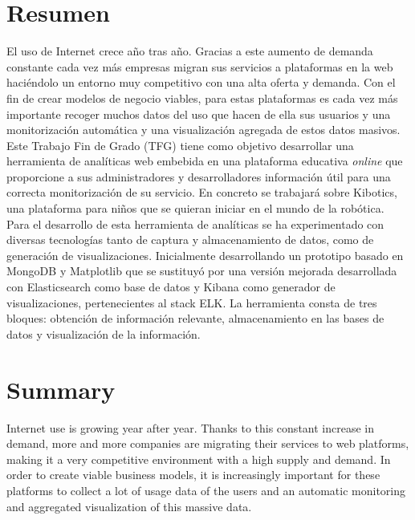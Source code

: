 \documentclass[a4paper, 12pt]{book}
\begin{document}
		
	\chapter*{Resumen}

		El uso de Internet crece año tras año. Gracias a este aumento de demanda constante cada vez más empresas migran sus servicios a plataformas en la web haciéndolo un entorno muy competitivo con una alta oferta y demanda. Con el fin de crear modelos de negocio viables, para estas plataformas es cada vez más importante recoger muchos datos del uso que hacen de ella sus usuarios y una monitorización automática y una visualización agregada de estos datos masivos. \\
		
		Este Trabajo Fin de Grado (TFG) tiene como objetivo desarrollar una herramienta de analíticas web embebida en una plataforma educativa \textit{online} que proporcione a sus administradores y desarrolladores información útil para una correcta monitorización de su servicio. En concreto se trabajará sobre Kibotics, una plataforma para niños que se quieran iniciar en el mundo de la robótica. \\
		
		Para el desarrollo de esta herramienta de analíticas se ha experimentado con diversas tecnologías tanto de captura y almacenamiento de datos, como de generación de visualizaciones. Inicialmente desarrollando un prototipo basado en MongoDB y Matplotlib que se sustituyó por una versión mejorada desarrollada con Elasticsearch como base de datos y Kibana como generador de visualizaciones, pertenecientes al stack ELK. La herramienta consta de tres bloques: obtención de información relevante, almacenamiento en las bases de datos y visualización de la información. \\
		
		
	\chapter*{Summary}
		Internet use is growing year after year. Thanks to this constant increase in demand, more and more companies are migrating their services to web platforms, making it a very competitive environment with a high supply and demand. In order to create viable business models, it is increasingly important for these platforms to collect a lot of usage data of the users and an automatic monitoring and aggregated visualization of this massive data. \\
	
\end{document}
